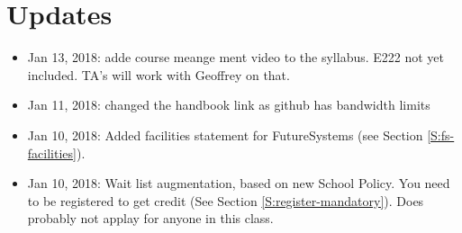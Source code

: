 
\chapter{Updates}

\begin{itemize}

\item Jan 13, 2018: adde course meange ment video to the
  syllabus. E222 not yet included. TA's will work with Geoffrey on that.

\item Jan 11, 2018: changed the handbook link as github has bandwidth limits

\item Jan 10, 2018: Added facilities statement for FutureSystems
  (see Section \ref{S:fs-facilities}).

\item Jan 10, 2018:  Wait list augmentation, based on new School
  Policy. You need to be registered to get credit (See Section
  \ref{S:register-mandatory}). Does probably not applay for anyone in
  this class. 

\end{itemize}

